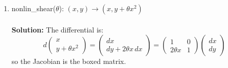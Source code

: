 \documentclass{article}
\begin{document}
\begin{enumerate}[label=(\alph*)]
\item nonlin\_shear($\theta$):
$(x, y) \rightarrow (x, y + \theta x^2)$
\\
\\
\textbf{Solution:} The differential is:
$$
d\begin{pmatrix} x \\ y+\theta x^2 \end{pmatrix} = \begin{pmatrix} dx \\ dy + 2\theta x\, dx \end{pmatrix}
= \boxed{\begin{pmatrix} 1 & 0 \\ 2\theta x & 1 \end{pmatrix}} \begin{pmatrix} dx \\ dy \end{pmatrix}
$$
so the Jacobian is the boxed matrix.


\end{enumerate}
\end{document}
